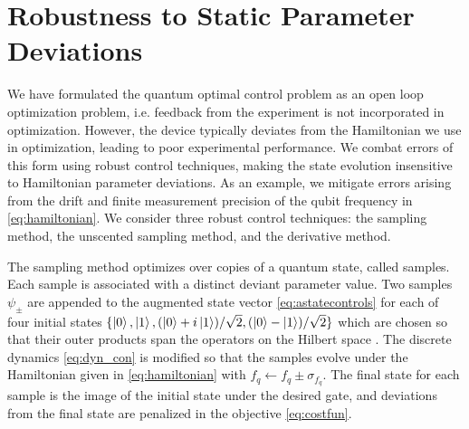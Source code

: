 \section{Robustness to Static Parameter Deviations \label{sec:static}}
We have formulated the quantum optimal control
problem as an open loop optimization problem, i.e.
feedback from the experiment is not incorporated in optimization.
However, the device typically deviates from the Hamiltonian we use in optimization,
leading to poor experimental performance. We combat errors
of this form using robust control techniques,
making the state evolution insensitive
to Hamiltonian parameter deviations. As an example,
we mitigate errors arising from the drift and finite measurement
precision of the qubit frequency in \eqref{eq:hamiltonian}.
We consider three robust control techniques:
the sampling method, the unscented sampling method,
and the derivative method.

The sampling method optimizes over copies of a quantum state,
called samples.
Each sample is associated with a distinct deviant parameter value.
Two samples $\psi_{\pm}$
are appended to the augmented state vector \eqref{eq:astatecontrols}
for each of four initial states
$\{\ket{0}, \ket{1}, (\ket{0} + i\ket{1}) / \sqrt{2},
(\ket{0} - \ket{1}) / \sqrt{2}\}$ which are chosen
so that their outer products span the operators on the
Hilbert space  \cite{chow2009randomized}.
The discrete dynamics \eqref{eq:dyn_con} is modified so that the
samples evolve under the Hamiltonian given in \eqref{eq:hamiltonian}
with $f_{q} \gets f_{q} \pm \sigma_{f_{q}}$. The final state
for each sample is the image of the initial state
under the desired gate, and deviations from the final state are
penalized in the objective \eqref{eq:costfun}.

